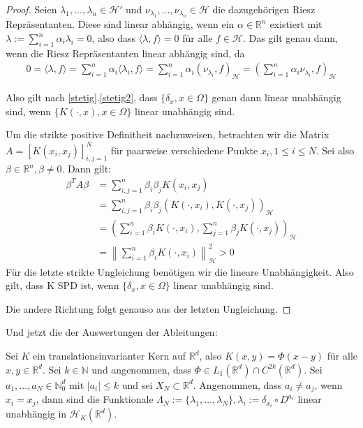 \begin{proof}
Seien $\lambda_1, \dots, \lambda_n \in \mathcal{H}'$ und $\nu_{\lambda_1},\dots, \nu_{\lambda_n} \in \mathcal{H}$ die dazugehörigen Riesz Repräsentanten. Diese sind linear abhängig, wenn ein $\alpha \in \mathbb{R}^n$ existiert mit $\lambda := \sum_{i=1}^n \alpha_i \lambda_i = 0$, also dass $\langle \lambda,f \rangle = 0$ für alle $f \in \mathcal{H}$. Das gilt genau dann, wenn die Riesz Repräsentanten linear abhängig sind, da
\begin{align*}
0 = \langle \lambda,f \rangle = \sum_{i=1}^n \alpha_i \langle \lambda_i,f \rangle = \sum_{i=1}^n \alpha_i \left( \nu_{\lambda_i},f\right)_\mathcal{H} = \left( \sum_{i=1}^n \alpha_i \nu_{\lambda_i}, f \right)_\mathcal{H}
\end{align*}

Also gilt nach \ref{stetig}.\ref{stetig2}, dass $\{\delta_x,x\in \Omega\}$ genau dann linear unabhängig sind, wenn $\{K(\cdot,x) , x \in \Omega\}$ linear unabhängig sind.

Um die strikte positive Definitheit nachzuweisen, betrachten wir die Matrix $A=[K(x_i, x_j)]_{i,j=1}^N$ für paarweise verschiedene Punkte $x_i, 1 \le i \le N$. Sei also $\beta \in \mathbb{R}^n, \beta \neq 0$. Dann gilt:
\begin{align*}
\beta^T A \beta &= \sum_{i,j=1}^n \beta_i \beta_j K(x_i, x_j)\\
&= \sum_{i,j=1}^n \beta_i  \beta_j \left(K(\cdot, x_i),K(\cdot,x_j)\right)_\mathcal{H}\\
&= \left( \sum_{i=1}^n \beta_i K(\cdot,x_i),\sum_{j=1}^n \beta_j K(\cdot, x_j) \right)_\mathcal{H}\\
&= \left\| \sum_{i=1}^n \beta_i K(\cdot, x_i) \right\|_\mathcal{H}^2 > 0
\end{align*}
Für die letzte strikte Ungleichung benötigen wir die lineare Unabhängigkeit. Also gilt, dass K \ac{SPD} ist, wenn $\{\delta_x,x\in \Omega\}$ linear unabhängig sind.

Die andere Richtung folgt genauso aus der letzten Ungleichung.
\end{proof}

Und jetzt die der Auswertungen der Ableitungen:

\begin{theorem}
\label{linUn}
Sei $K$ ein translationsinvarianter Kern auf $\mathbb{R}^d$, also $K(x,y) = \Phi (x-y)$ für alle $x,y \in \mathbb{R}^d$. Sei $k \in \mathbb{N}$ und angenommen, dass $\Phi \in L_1(\mathbb{R}^d) \cap C^{2k}(\mathbb{R}^d)$. Sei $a_1, \dots, a_N \in \mathbb{N}_0^d$ mit $|a_i| \le k$ und sei $X_N \subset \mathbb{R}^d$. Angenommen, dass $a_i \neq a_j$, wenn $x_i = x_j$, dann sind die Funktionale $\Lambda_N := \{\lambda_1, \dots, \lambda_N\}, \lambda_i := \delta_{x_i} \circ D^{a_i}$ linear unabhängig in $\mathcal{H}_K(\mathbb{R}^d)$.
\end{theorem}

